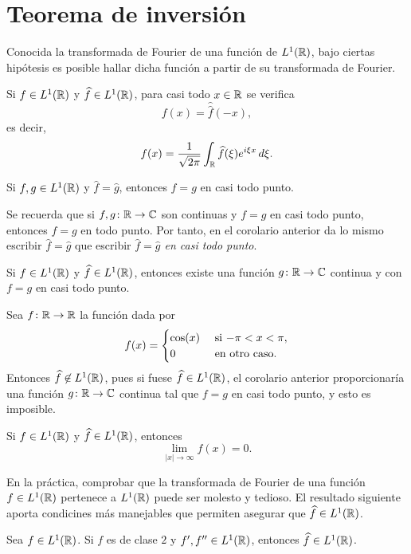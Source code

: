 \documentclass[a4paper, 12pt, extrafontsizes]{memoir}
\begin{document}
\section{Teorema de inversión}

Conocida la transformada de Fourier de una función de $L^1(\mathbb R)$, bajo ciertas hipótesis es posible hallar dicha función a partir de su transformada de Fourier.

\begin{theorem}\label{teo:B.4.1}
    Si $f \in L^1(\mathbb R)$ y $\widehat{f}\in L^1(\mathbb R)$, para casi todo $x \in \mathbb R$ se verifica
    \[f(x) = \widehat{\widehat{f}}(-x),\]
    es decir,
    \[f(x)=\frac{1}{\sqrt{2\pi}}\int_\mathbb R \widehat{f}(\xi)e^{i\xi x} \, d\xi.\]
\end{theorem}

\begin{corollary}\label{cor:B.4.2}
    Si $f,g \in L^1(\mathbb R)$ y $\widehat{f}=\widehat{g}$, entonces $f = g$ en casi todo punto.
\end{corollary}

Se recuerda que si $f,g \colon \mathbb R \to \mathbb C$ son continuas y $f = g$ en casi todo punto, entonces $f = g$ en todo punto. Por tanto, en el corolario anterior da lo mismo escribir $\widehat{f} = \widehat{g}$ que escribir \emph{$\widehat{f} = \widehat{g}$ en casi todo punto}.

\begin{corollary}
    Si $f \in L^1(\mathbb R)$ y $\widehat{f} \in L^1(\mathbb R)$, entonces existe una función $g \colon \mathbb R \to \mathbb C$ continua y con $f = g$ en casi todo punto.
\end{corollary}

\begin{example}
    Sea $f \colon \mathbb R \to \mathbb R$ la función dada por
    \[f(x)=\begin{cases}
        \cos(x) & $ si $ -\pi < x < \pi, \\
        0 & $ en otro caso$.
    \end{cases}\]
    Entonces $\widehat{f} \not\in L^1(\mathbb R)$, pues si fuese $\widehat{f} \in L^1(\mathbb R)$, el corolario anterior proporcionaría una función $g \colon \mathbb R \to \mathbb C$ continua tal que $f = g$ en casi todo punto, y esto es imposible.
\end{example}

\begin{corollary}
    Si $f \in L^1(\mathbb R)$ y $\widehat{f}\in L^1(\mathbb R)$, entonces
    \[\lim_{|x| \to \infty}f(x)=0.\]
\end{corollary}

En la práctica, comprobar que la transformada de Fourier de una función $f \in L^1(\mathbb R)$ pertenece a $L^1(\mathbb R)$ puede ser molesto y tedioso. El resultado siguiente aporta condicines más manejables que permiten asegurar que $\widehat{f}\in L^1(\mathbb R)$.

\begin{proposition}
    Sea $f \in L^1(\mathbb R)$. Si $f$ es de clase $2$ y $f',f'' \in L^1(\mathbb R)$, entonces $\widehat{f} \in L^1(\mathbb R)$.
\end{proposition}
\end{document}

